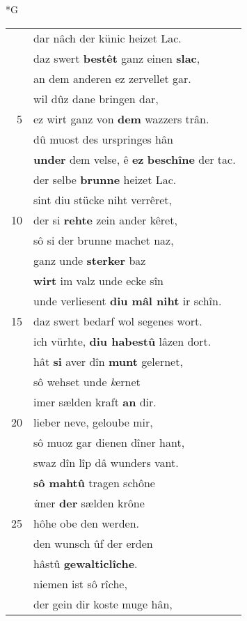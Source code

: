 \documentclass[8pt,a4paper,notitlepage]{article}
\begin{document}
\begin{table}[ht]
\begin{minipage}[t]{0.5\linewidth}
\small
\begin{center}*G
\end{center}
\begin{tabular}{rl}
 & dar nâch der künic heizet Lac.\\ 
 & daz swert \textbf{bestêt} ganz einen \textbf{slac},\\ 
 & an dem anderen ez zervellet gar.\\ 
 & wil dûz dane bringen dar,\\ 
5 & ez wirt ganz von \textbf{dem} wazzers trân.\\ 
 & dû muost des urspringes hân\\ 
 & \textbf{under} dem velse, ê \textbf{ez} \textbf{beschîne} der tac.\\ 
 & der selbe \textbf{brunne} heizet Lac.\\ 
 & sint diu stücke niht verrêret,\\ 
10 & der si \textbf{rehte} zein ander kêret,\\ 
 & sô si der brunne machet naz,\\ 
 & ganz unde \textbf{sterker} baz\\ 
 & \textbf{wirt} im valz unde ecke sîn\\ 
 & unde verliesent \textbf{diu mâl niht} ir schîn.\\ 
15 & daz swert bedarf wol segenes wort.\\ 
 & ich vürhte, \textbf{diu habestû} lâzen dort.\\ 
 & hât \textbf{si} aver dîn \textbf{munt} gelernet,\\ 
 & sô wehset unde \textit{k}ernet\\ 
 & imer sælden kraft \textbf{an} dir.\\ 
20 & lieber neve, geloube mir,\\ 
 & sô muoz gar dienen dîner hant,\\ 
 & swaz dîn lîp dâ wunders vant.\\ 
 & \textbf{sô mahtû} tragen schône\\ 
 & \textit{i}mer \textbf{der} sælden krône\\ 
25 & hôhe obe den werden.\\ 
 & den wunsch ûf der erden\\ 
 & hâstû \textbf{gewalticlîche}.\\ 
 & niemen ist sô rîche,\\ 
 & der gein dir koste muge hân,\\ 

\end{tabular}
\end{minipage}
\end{table}
\end{document}
